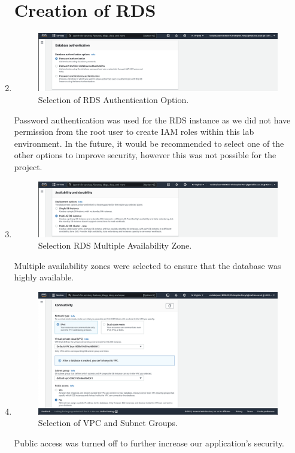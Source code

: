 \begin{enumerate}
    \section{Creation of RDS}\label{sec:creation-of-rds}

    \item
    \begin{figure}[H]
        \centering
        \includegraphics[width=\textwidth]{resources/rds/rds-authentication.png}
        \caption{Selection of RDS Authentication Option.}
        \label{fig:rds-auth}
    \end{figure}
    Password authentication was used for the RDS instance as we did not have permission from the root user to create IAM
    roles within this lab environment.
    In the future, it would be recommended to select one of the other options to improve security, however this was not
    possible for the project.

    \item
    \begin{figure}[H]
        \centering
        \includegraphics[width=\textwidth]{resources/rds/rds-availability-durability}
        \caption{Selection RDS Multiple Availability Zone.}
        \label{fig:rds-avail}
    \end{figure}
    Multiple availability zones were selected to ensure that the database was highly available.

    \item
    \begin{figure}[H]
        \centering
        \includegraphics[width=\textwidth]{resources/rds/rds-connectivity-1}
        \caption{Selection of VPC and Subnet Groups.}
        \label{fig:rds-connecting}
    \end{figure}
    Public access was turned off to further increase our application's security.


\end{enumerate}
